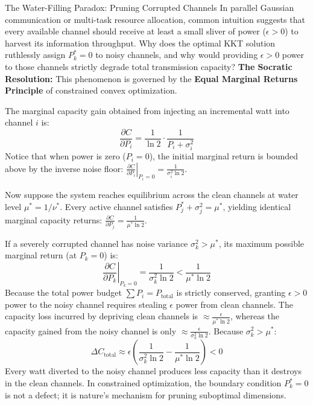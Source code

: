\begin{ponderbox}{The Water-Filling Paradox: Pruning Corrupted Channels}
In parallel Gaussian communication or multi-task resource allocation, common intuition suggests that every available channel should receive at least a small sliver of power ($\epsilon > 0$) to harvest its information throughput. Why does the optimal KKT solution ruthlessly assign $P_k^* = 0$ to noisy channels, and why would providing $\epsilon > 0$ power to those channels strictly degrade total transmission capacity?
\tcblower
\textbf{The Socratic Resolution:} This phenomenon is governed by the \textbf{Equal Marginal Returns Principle} of constrained convex optimization.

The marginal capacity gain obtained from injecting an incremental watt into channel $i$ is:
\begin{equation}
\frac{\partial C}{\partial P_i} = \frac{1}{\ln 2} \cdot \frac{1}{P_i + \sigma_i^2}
\end{equation}
Notice that when power is zero ($P_i = 0$), the initial marginal return is bounded above by the inverse noise floor: $\left.\frac{\partial C}{\partial P_i}\right|_{P_i = 0} = \frac{1}{\sigma_i^2 \ln 2}$. 

Now suppose the system reaches equilibrium across the clean channels at water level $\mu^* = 1/\nu^*$. Every active channel satisfies $P_j^* + \sigma_j^2 = \mu^*$, yielding identical marginal capacity returns: $\frac{\partial C}{\partial P_j} = \frac{1}{\mu^* \ln 2}$.

If a severely corrupted channel has noise variance $\sigma_k^2 > \mu^*$, its maximum possible marginal return (at $P_k = 0$) is:
\begin{equation}
\left.\frac{\partial C}{\partial P_k}\right|_{P_k = 0} = \frac{1}{\sigma_k^2 \ln 2} < \frac{1}{\mu^* \ln 2}
\end{equation}
Because the total power budget $\sum P_i = P_{\text{total}}$ is strictly conserved, granting $\epsilon > 0$ power to the noisy channel requires stealing $\epsilon$ power from clean channels. 
The capacity loss incurred by depriving clean channels is $\approx \frac{\epsilon}{\mu^* \ln 2}$, whereas the capacity gained from the noisy channel is only $\approx \frac{\epsilon}{\sigma_k^2 \ln 2}$. Because $\sigma_k^2 > \mu^*$:
\begin{equation}
\Delta C_{\text{total}} \approx \epsilon \left( \frac{1}{\sigma_k^2 \ln 2} - \frac{1}{\mu^* \ln 2} \right) < 0
\end{equation}
Every watt diverted to the noisy channel produces less capacity than it destroys in the clean channels. In constrained optimization, the boundary condition $P_k^* = 0$ is not a defect; it is nature's mechanism for pruning suboptimal dimensions.
\end{ponderbox}

